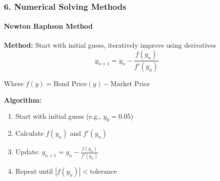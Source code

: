 \documentclass{beamer}
\begin{document}
\begin{foundframe}[t]
    \frametitle{6. Numerical Solving Methods}
    \framesubtitle{Newton Raphson Method}

    \textbf{Method:} Start with initial guess, iteratively improve using derivatives
    $$y_{n+1} = y_n - \frac{f(y_n)}{f'(y_n)}$$
    
    Where $f(y) = \text{Bond Price}(y) - \text{Market Price}$
    \vspace{1em}

    \textbf{Algorithm:}
    \begin{enumerate}
        \item Start with initial guess (e.g., $y_0 = 0.05$)
        \item Calculate $f(y_n)$ and $f'(y_n)$
        \item Update: $y_{n+1} = y_n - \frac{f(y_n)}{f'(y_n)}$
        \item Repeat until $|f(y_n)| < \text{tolerance}$
    \end{enumerate}

\end{foundframe}
\end{document}
